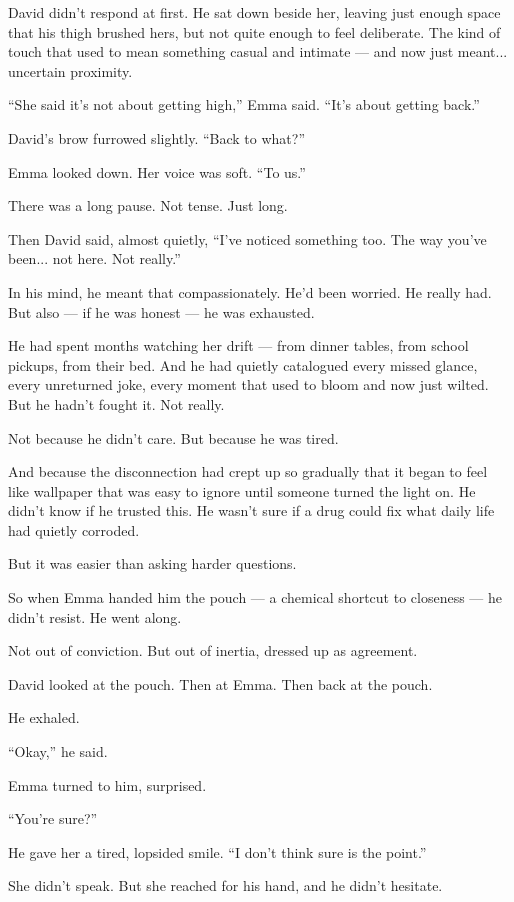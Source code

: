 David didn’t respond at first. He sat down beside her, leaving just enough space that his 
thigh brushed hers, but not quite enough to feel deliberate. The kind of touch that used to 
mean something casual and intimate — and now just meant... uncertain proximity.

``She said it’s not about getting high,'' Emma said. ``It’s about getting back.''

David’s brow furrowed slightly. ``Back to what?''

Emma looked down. Her voice was soft. ``To us.''

There was a long pause. Not tense. Just long.

Then David said, almost quietly, ``I’ve noticed something too. The way you’ve been... not here. 
Not really.''

In his mind, he meant that compassionately. He’d been worried. He really had. But also --- 
if he was honest --- he was exhausted.

He had spent months watching her drift — from dinner tables, from school pickups, from their bed. 
And he had quietly catalogued every missed glance, every unreturned joke, every moment that used 
to bloom and now just wilted. But he hadn’t fought it. Not really.

Not because he didn’t care.
But because he was tired.

And because the disconnection had crept up so gradually that it began to feel like wallpaper 
that was easy to ignore until someone turned the light on. He didn’t know if he trusted this. 
He wasn’t sure if a drug could fix what daily life had quietly corroded.

But it was easier than asking harder questions.

So when Emma handed him the pouch --- a chemical shortcut to closeness --- he didn’t resist.
He went along.

Not out of conviction.
But out of inertia, dressed up as agreement.

David looked at the pouch. Then at Emma. Then back at the pouch.

He exhaled.

``Okay,'' he said.

Emma turned to him, surprised.

``You’re sure?''

He gave her a tired, lopsided smile. ``I don’t think sure is the point.''

She didn’t speak. But she reached for his hand, and  he didn’t hesitate.

